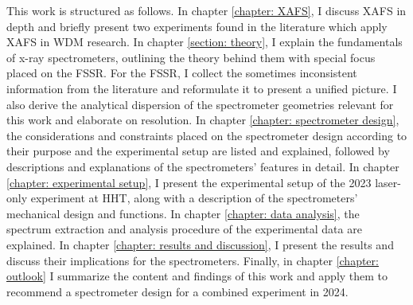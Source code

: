 This work is structured as follows. In chapter \ref{chapter: XAFS}, I discuss XAFS in depth and briefly present two experiments found in the literature which apply XAFS in WDM research. In chapter \ref{section: theory}, I explain the fundamentals of x-ray spectrometers, 
outlining the theory behind them with special focus 
placed on the FSSR. For the FSSR, I collect the 
sometimes inconsistent information from the 
literature and reformulate it to present a unified 
picture. I also derive the 
analytical dispersion of the spectrometer geometries relevant for 
this work and elaborate 
on resolution. In chapter \ref{chapter: spectrometer design}, the considerations and 
constraints placed on the spectrometer design 
according to their purpose and the experimental setup 
are listed and explained, followed by descriptions and explanations of the spectrometers' features in detail. In chapter \ref{chapter: experimental setup}, I present the experimental setup of the 2023 laser-only experiment at HHT, along with a description of the spectrometers' mechanical design and functions. In chapter \ref{chapter: data analysis}, the spectrum extraction and analysis procedure of the experimental data are explained. In chapter \ref{chapter: results and discussion}, I present the results and discuss their implications for the spectrometers. Finally, in chapter \ref{chapter: outlook} I summarize the content and findings of this work and apply them to recommend a spectrometer design for a combined experiment in 2024. 





